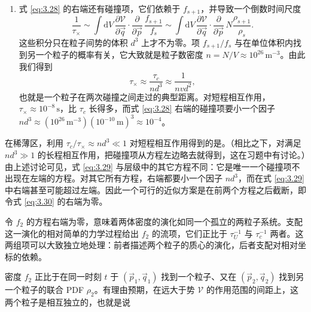 \begin{enumerate}[label=(\alph*),itemsep=0.5em,topsep=0.4em,start=3]
  \item 式 \eqref{eq:3.28} 的右端还有碰撞项，它们依赖于 $f_{s+1}$，并导致一个倒数时间尺度
  \begin{equation*}
    \frac{1}{\tau_\times}\sim\int \mathrm{d}V\,\frac{\partial\mathscr V}{\partial\vec q}\cdot\frac{\partial}{\partial\vec p}\,\frac{f_{s+1}}{f_s}\sim\int \mathrm{d}V\,\frac{\partial\mathscr V}{\partial\vec q}\cdot\frac{\partial}{\partial\vec p}\,N\frac{\rho_{s+1}}{\rho_s}.
  \end{equation*}
  这些积分只在粒子间势的体积 $d^3$ 上才不为零。项 $f_{s+1}/f_s$ 与在单位体积内找到另一个粒子的概率有关，它大致就是粒子数密度 $n=N/V\approx10^{26}\,\mathrm{m^{-3}}$。由此我们得到
  \begin{equation}\label{eq:3.31}
    \tau_\times\approx\frac{\tau_c}{nd^3}\approx\frac{1}{nvd^2},
  \end{equation}
  也就是一个粒子在两次碰撞之间走过的典型距离。对短程相互作用，$\tau_\times\approx10^{-8}\,\mathrm{s}$，比 $\tau_c$ 长得多，而式 \eqref{eq:3.28} 右端的碰撞项要小一个因子 $nd^3\approx(10^{26}\,\mathrm{m^{-3}})(10^{-10}\,\mathrm{m})^3\approx10^{-4}$。
\end{enumerate}


在稀薄区，利用 $\tau_c/\tau_\times\approx nd^3\ll1$ 对短程相互作用得到的是。（相比之下，对满足 $nd^3\gg1$ 的长程相互作用，把碰撞项从方程左边略去就得到，这在习题中有讨论。）由上述讨论可见，式 \eqref{eq:3.29} 与层级中的其它方程不同：它是唯一一个碰撞项不出现在左端的方程。对其它所有方程，右端都要小一个因子 $nd^3$，而在式 \eqref{eq:3.29} 中右端甚至可能超过左端。因此一个可行的近似方案是在前两个方程之后截断，即令式 \eqref{eq:3.30} 的右端为零。

令 $f_2$ 的方程右端为零，意味着两体密度的演化如同一个孤立的两粒子系统。支配这一演化的相对简单的力学过程给出 $f_2$ 的流项，它们正比于 $\tau_U^{-1}$ 与 $\tau_c^{-1}$ 两者。这两组项可以大致独立地处理：前者描述两个粒子的质心的演化，后者支配对相对坐标的依赖。

密度 $f_2$ 正比于在同一时刻 $t$ 于 $(\vec p_1,\vec q_1)$ 找到一个粒子、又在 $(\vec p_2,\vec q_2)$ 找到另一个粒子的联合 PDF $\rho_2$。有理由预期，在远大于势 $\mathscr V$ 的作用范围的间距上，这两个粒子是相互独立的，也就是说

